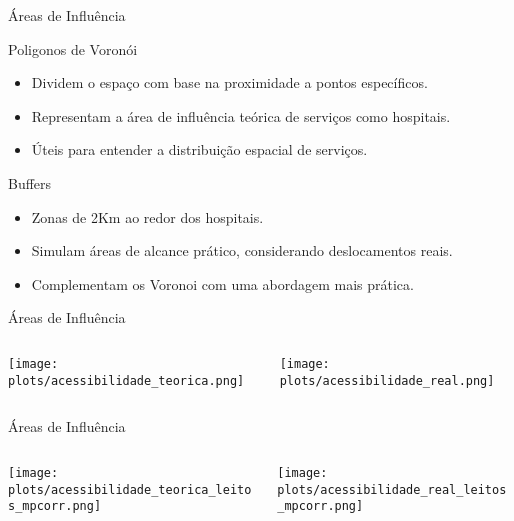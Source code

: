 \documentclass{beamer}
\begin{document}
\begin{frame}{Áreas de Influência}
    \begin{block}{Poligonos de Voronói}
      \begin{itemize}
        \item Dividem o espaço com base na proximidade a pontos específicos.
        \item Representam a área de influência teórica de serviços como hospitais.
        \item Úteis para entender a distribuição espacial de serviços.
      \end{itemize}
    \end{block}

    \begin{block}{Buffers}
      \begin{itemize}
        \item Zonas de 2Km ao redor dos hospitais.
        \item Simulam áreas de alcance prático, considerando deslocamentos reais.
        \item Complementam os Voronoi com uma abordagem mais prática.
      \end{itemize}    \end{block}
\end{frame}

\begin{frame}{Áreas de Influência}
    \begin{columns}
        \begin{column}{0.5\textwidth}
            \centering
            \texttt{[image: plots/acessibilidade\_teorica.png]} 
        \end{column}

        \begin{column}{0.5\textwidth}
            \centering
            \texttt{[image: plots/acessibilidade\_real.png]} 
        \end{column}
    \end{columns}
\end{frame}

\begin{frame}{Áreas de Influência}
    \begin{columns}
        \begin{column}{0.5\textwidth}
            \texttt{[image: plots/acessibilidade\_teorica\_leitos\_mpcorr.png]} 
        \end{column}

        \begin{column}{0.5\textwidth}
            \texttt{[image: plots/acessibilidade\_real\_leitos\_mpcorr.png]} 
        \end{column}
    \end{columns}
\end{frame}
\end{document}
